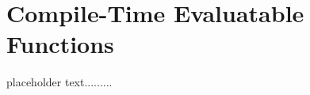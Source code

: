 \newpage
\section[{\tt constexpr} Functions]{Compile-Time Evaluatable Functions}\label{constexprfunc}


placeholder text.........


